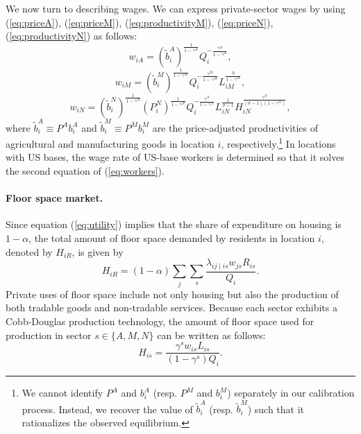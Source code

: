 \documentclass[12pt, unicode, a4paper]{article}
\newcommand{\1}{\mbox{1}\hspace{-0.25em}\mbox{l}} %
\begin{document}
We now turn to describing wages.
We can express private-sector wages by using (\ref{eq:priceA}), (\ref{eq:priceM}), (\ref{eq:productivityM}), (\ref{eq:priceN}), (\ref{eq:productivityN}) as follows:
\begin{equation}
\label{eq:wageA}
    w_{iA}=(\widetilde{b}_i^A)^{\frac{1}{1-\gamma^A}} Q_i^{-\frac{\gamma^A}{1-\gamma^A}},
\end{equation}
\begin{equation}
\label{eq:wageM}
    w_{iM}=(\widetilde{b}_i^M)^{\frac{1}{1-\gamma^M}} Q_i^{-\frac{\gamma^M}{1-\gamma^M}} L_{iM}^{\frac{\eta}{1-\gamma^M}},
\end{equation}
\begin{equation}
\label{eq:wageN}
    w_{iN}=(\widetilde{b}_i^N)^{\frac{1}{1-\gamma^N}} (P_i^N)^{\frac{1}{1-\gamma^N}} Q_i^{-\frac{\gamma^N}{1-\gamma^N}} L_{iN}^{\frac{1}{\sigma-1}} H_{iN}^{\frac{\gamma^N}{(\sigma-1)(1-\gamma^N)}},
\end{equation}
where $\widetilde{b}_i^A \equiv P^Ab_i^A$ and $\widetilde{b}_i^M \equiv P^Mb_i^M$ are the price-adjusted productivities of agricultural and manufacturing goods in location $i$, respectively.\footnote{
We cannot identify $P^A$ and $b_i^A$ (resp. $P^M$ and $b_i^M$) separately in our calibration process. Instead, we recover the value of $\widetilde{b}_i^A$ (resp. $\widetilde{b}_i^M$) such that it rationalizes the observed equilibrium.
}
In locations with US bases, the wage rate of US-base workers is determined so that it solves the second equation of (\ref{eq:workers}).


\paragraph{Floor space market.}
Since equation (\ref{eq:utility}) implies that the share of expenditure on housing is $1-\alpha$, the total amount of floor space demanded by residents in location $i$, denoted by $H_{iR}$, is given by
\begin{equation}
\label{eq:land_house}
    H_{iR}=(1-\alpha)\sum_j \sum_s \frac{\lambda_{ij \mid is}w_{js}R_{is}}{Q_i}.
\end{equation}
Private uses of floor space include not only housing but also the production of both tradable goods and non-tradable services. Because each sector exhibits a Cobb-Douglas production technology, the amount of floor space used for production in sector $s \in \{ A,M,N \}$ can be written as follows:
\begin{equation}
\label{eq:land_production}
    H_{is}=\frac{\gamma^s w_{is}L_{is}}{(1-\gamma^s)Q_i}.
\end{equation}
\end{document}
